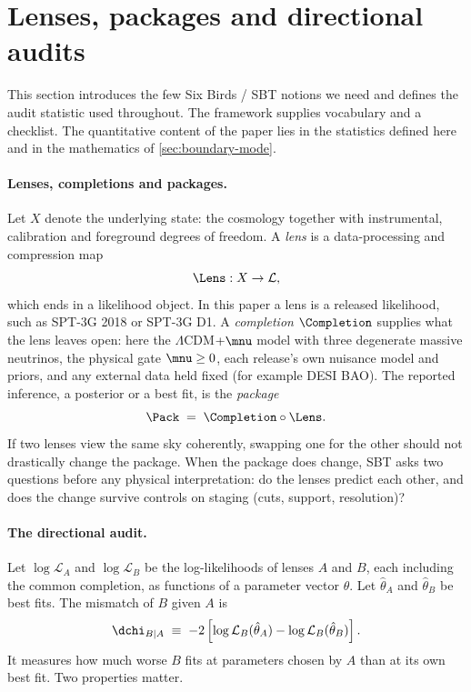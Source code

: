 \section{Lenses, packages and directional audits}
\label{sec:sbt-framework}

This section introduces the few Six Birds / SBT notions we need \cite{sixbirds_foundations,sixbirds_darkenergy} and defines the audit statistic used throughout. The framework supplies vocabulary and a checklist. The quantitative content of the paper lies in the statistics defined here and in the mathematics of \cref{sec:boundary-mode}.

\paragraph{Lenses, completions and packages.}
Let $X$ denote the underlying state: the cosmology together with instrumental, calibration and foreground degrees of freedom. A \emph{lens} is a data-processing and compression map
\begin{equation}
  \Lens : X \to \mathcal{L},
  \label{eq:lens_map}
\end{equation}
which ends in a likelihood object. In this paper a lens is a released likelihood, such as SPT-3G 2018 or SPT-3G D1. A \emph{completion} $\Completion$ supplies what the lens leaves open: here the $\Lambda$CDM$+\mnu$ model with three degenerate massive neutrinos, the physical gate $\mnu\ge0$, each release's own nuisance model and priors, and any external data held fixed (for example DESI BAO). The reported inference, a posterior or a best fit, is the \emph{package}
\begin{equation}
  \Pack \;=\; \Completion\circ\Lens .
  \label{eq:packaging_def}
\end{equation}
If two lenses view the same sky coherently, swapping one for the other should not drastically change the package. When the package does change, SBT asks two questions before any physical interpretation: do the lenses predict each other, and does the change survive controls on staging (cuts, support, resolution)?

\paragraph{The directional audit.}
Let $\log\mathcal{L}_A$ and $\log\mathcal{L}_B$ be the log-likelihoods of lenses $A$ and $B$, each including the common completion, as functions of a parameter vector $\theta$. Let $\hat\theta_A$ and $\hat\theta_B$ be best fits. The mismatch of $B$ given $A$ is
\begin{equation}
  \dchi_{B|A} \;\equiv\; -2\left[\log \mathcal{L}_B(\hat\theta_A) - \log \mathcal{L}_B(\hat\theta_B)\right].
  \label{eq:dchi_def}
\end{equation}
It measures how much worse $B$ fits at parameters chosen by $A$ than at its own best fit. Two properties matter.

